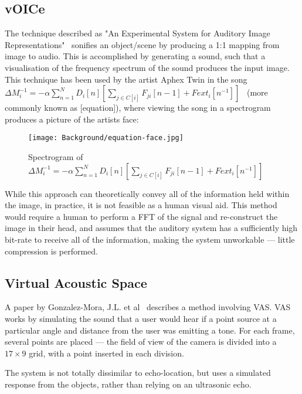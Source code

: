 \subsection{vOICe}
The technique described as "An Experimental System for Auditory Image Representations"~\cite{vOICe} sonifies an object/scene by producing a 1:1 mapping from image to audio. This is accomplished by generating a sound, such that a visualisation of the frequency spectrum of the sound produces the input image. This technique has been used by the artist Aphex Twin in the song $\Delta M_i^{-1} = - \alpha \sum_{n=1}^N D_i \left[ n \right] \left[ \sum_{j \in C \left[ i \right]}^{} F_{ji} \left[ n -1 \right] + Fext_i \left[ n^{-1} \right] \right]$~\cite{aphex-equation} (more commonly known as [equation]), where viewing the song in a spectrogram produces a picture of the artists face:

\begin{figure}[H]
    \centering
    \texttt{[image: Background/equation-face.jpg]}
    \caption{Spectrogram of $\Delta M_i^{-1} = - \alpha \sum_{n=1}^N D_i \left[ n \right] \left[ \sum_{j \in C \left[ i \right]}^{} F_{ji} \left[ n -1 \right] + Fext_i \left[ n^{-1} \right] \right]$~\cite{aphex-equation}}
\end{figure}

While this approach can theoretically convey all of the information held within the image, in practice, it is not feasible as a human visual aid. This method would require a human to perform a \ac{FFT} of the signal and re-construct the image in their head, and assumes that the auditory system has a sufficiently high bit-rate to receive all of the information, making the system unworkable --- little compression is performed. 

\subsection{Virtual Acoustic Space}
\label{sec:vas}
A paper by Gonzalez-Mora, J.L. et al~\cite{vas} describes a method involving \ac{VAS}. \ac{VAS} works by simulating the sound that a user would hear if a point source at a particular angle and distance from the user was emitting a tone. For each frame, several points are placed --- the field of view of the camera is divided into a $17\times9$ grid, with a point inserted in each division. 

The system is not totally dissimilar to echo-location, but uses a simulated response from the objects, rather than relying on an ultrasonic echo.

